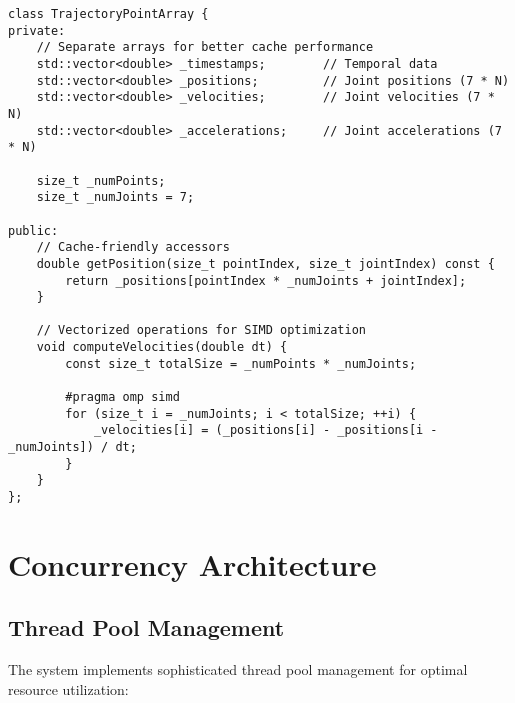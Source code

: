 \begin{lstlisting}[caption={Cache-Optimized Trajectory Storage}, label={lst:cache_optimization}]
class TrajectoryPointArray {
private:
    // Separate arrays for better cache performance
    std::vector<double> _timestamps;        // Temporal data
    std::vector<double> _positions;         // Joint positions (7 * N)
    std::vector<double> _velocities;        // Joint velocities (7 * N)
    std::vector<double> _accelerations;     // Joint accelerations (7 * N)
    
    size_t _numPoints;
    size_t _numJoints = 7;
    
public:
    // Cache-friendly accessors
    double getPosition(size_t pointIndex, size_t jointIndex) const {
        return _positions[pointIndex * _numJoints + jointIndex];
    }
    
    // Vectorized operations for SIMD optimization
    void computeVelocities(double dt) {
        const size_t totalSize = _numPoints * _numJoints;
        
        #pragma omp simd
        for (size_t i = _numJoints; i < totalSize; ++i) {
            _velocities[i] = (_positions[i] - _positions[i - _numJoints]) / dt;
        }
    }
};
\end{lstlisting}

\section{Concurrency Architecture}
\label{sec:concurrency_architecture}

\subsection{Thread Pool Management}

The system implements sophisticated thread pool management for optimal resource utilization:

